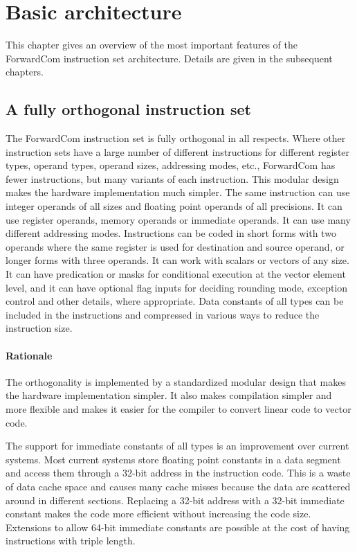 \documentclass[forwardcom.tex]{subfiles}
\begin{document}
\RaggedRight

\chapter{Basic architecture}

This chapter gives an overview of the most important features of the ForwardCom instruction set architecture. Details are given in the subsequent chapters.

\section{A fully orthogonal instruction set}
The ForwardCom instruction set is fully orthogonal in all respects. 
Where other instruction sets have a large number of different instructions for different register types, operand types, operand sizes, addressing modes, etc., ForwardCom has fewer instructions, but many variants of each instruction. This modular design makes the hardware implementation much simpler.
The same instruction can use integer operands of all sizes and floating point operands of all precisions. It can use register operands, memory operands or immediate operands. It can use many different addressing modes. Instructions can be coded in short forms with two operands where the same register is used for destination and source operand, or longer forms with three operands. It can work with scalars or vectors of any size. It can have predication or masks for conditional execution at the vector element level, and it can have optional flag inputs for deciding rounding mode, exception control and other details, where appropriate. Data constants of all types can be included in the instructions and compressed in various ways to reduce the instruction size.

\subsubsection{Rationale}
The orthogonality is implemented by a standardized modular design that makes the hardware implementation simpler. It also makes compilation simpler and more flexible and makes it easier for the compiler to convert linear code to vector code.
\vspace{2mm}

The support for immediate constants of all types is an improvement over current systems. Most current systems store floating point constants in a data segment and access them through a 32-bit address in the instruction code. This is a waste of data cache space and causes many cache misses because the data are scattered around in different sections. Replacing a 32-bit address with a 32-bit immediate constant makes the code more efficient without increasing the code size. Extensions to allow 64-bit immediate constants are possible at the cost of having instructions with triple length.
\end{document}
